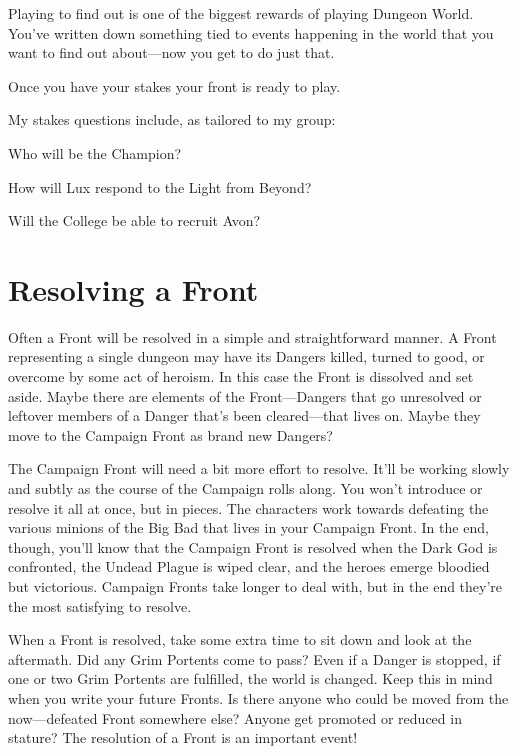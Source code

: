  

Playing to find out is one of the biggest rewards of playing Dungeon World. You've written down something tied to events happening in the world that you want to find out about—now you get to do just that.

 

Once you have your stakes your front is ready to play.

 
\startExample
My stakes questions include, as tailored to my group: 
\startitemize[1,packed]

\item Who will be the Champion?

 
\item How will Lux respond to the Light from Beyond?

 
\item Will the College be able to recruit Avon?


\stopitemize

\stopExample
 
\section{Resolving a Front}   
 

Often a Front will be resolved in a simple and straightforward manner. A Front representing a single dungeon may have its Dangers killed, turned to good, or overcome by some act of heroism. In this case the Front is dissolved and set aside. Maybe there are elements of the Front—Dangers that go unresolved or leftover members of a Danger that’s been cleared—that lives on. Maybe they move to the Campaign Front as brand new Dangers?

 

The Campaign Front will need a bit more effort to resolve. It’ll be working slowly and subtly as the course of the Campaign rolls along. You won’t introduce or resolve it all at once, but in pieces. The characters work towards defeating the various minions of the Big Bad that lives in your Campaign Front. In the end, though, you’ll know that the Campaign Front is resolved when the Dark God is confronted, the Undead Plague is wiped clear, and the heroes emerge bloodied but victorious. Campaign Fronts take longer to deal with, but in the end they’re the most satisfying to resolve.

 

When a Front is resolved, take some extra time to sit down and look at the aftermath. Did any Grim Portents come to pass? Even if a Danger is stopped, if one or two Grim Portents are fulfilled, the world is changed. Keep this in mind when you write your future Fronts. Is there anyone who could be moved from the now—defeated Front somewhere else? Anyone get promoted or reduced in stature? The resolution of a Front is an important event!

